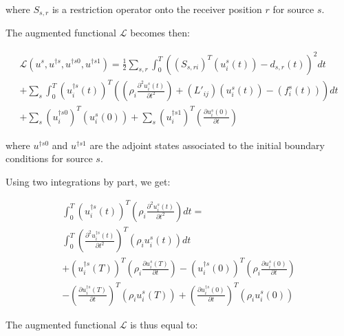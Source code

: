 \documentclass{article}
\begin{document}
where $S_{s, r}$ is a restriction operator onto the receiver position $r$ for source $s$.

The augmented functional $\mathscr{L}$ becomes then:

\begin{equation}
	\begin{split}
		\mathscr{L} (u^s, u^{\dagger s}, u^{\dagger s 0}, u^{\dagger s 1}) = \frac{1}{2} \sum_{s, r} \int_0^T \left( \left( S_{s, r i} \right) ^{T} \left( u_i^s (t) \right) - d_{s, r} (t) \right) ^2 dt \\
		+ \sum_s \int_0^T \left( u_i^{\dagger s} (t) \right) ^{T} \left( \left( \rho_i \frac{\partial ^2 u_i^s (t)}{\partial t^2} \right) + \left( L'_{ij} \right) \left( u_i^s (t) \right) - \left( f_i^s (t) \right) \right) dt \\
		+ \sum_s \left( u_i^{\dagger s 0} \right) ^{T} \left( u_i^s(0) \right) + \sum_s \left( u_i^{\dagger s 1} \right) ^{T} \left( \frac{\partial u_i^s (0)}{\partial t} \right)
	\end{split}
\end{equation}

where $u^{\dagger s 0}$ and $u^{\dagger s 1}$ are the adjoint states associated to the initial boundary conditions for source $s$.

Using two integrations by part, we get:

\begin{equation}
	\begin{split}
		\int_0^T \left( u_i^{\dagger s} (t) \right) ^{T} \left( \rho_i \frac{\partial ^2 u_i^s (t)}{\partial t^2} \right) dt = \\
		\int_0^T \left( \frac{\partial ^2 u_i^{\dagger s} (t)}{\partial t^2} \right) ^{T} \left( \rho_i u_i^s (t) \right) dt \\
		+ \left( u_i^{\dagger s} (T) \right) ^{T} \left( \rho_i \frac{\partial u_i^s (T)}{\partial t} \right) - \left( u_i^{\dagger s} (0) \right) ^{T} \left( \rho_i \frac{\partial u_i^s (0)}{\partial t} \right) \\
		- \left( \frac{\partial u_i^{\dagger s} (T)}{\partial t} \right) ^{T} \left( \rho_i u_i^s (T) \right) + \left( \frac{\partial u_i^{\dagger s} (0)}{\partial t} \right) ^{T} \left( \rho_i u_i^s (0) \right)
	\end{split}
\end{equation}

The augmented functional $\mathscr{L}$ is thus equal to:
\end{document}
